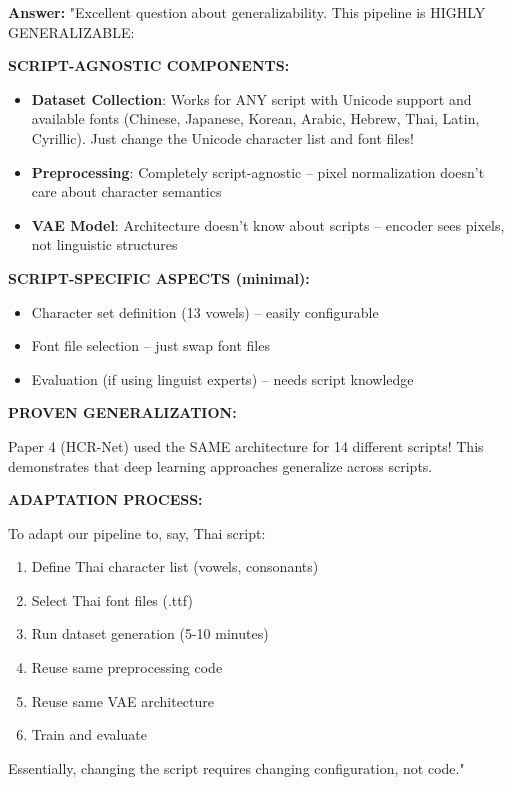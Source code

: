 \documentclass[11pt,a4paper]{article}
\begin{document}
\begin{answerbox}
\textbf{Answer:} "Excellent question about generalizability. This pipeline is HIGHLY GENERALIZABLE:

\textbf{SCRIPT-AGNOSTIC COMPONENTS:}
\begin{itemize}
\item \textbf{Dataset Collection}: Works for ANY script with Unicode support and available fonts (Chinese, Japanese, Korean, Arabic, Hebrew, Thai, Latin, Cyrillic). Just change the Unicode character list and font files!
\item \textbf{Preprocessing}: Completely script-agnostic -- pixel normalization doesn't care about character semantics
\item \textbf{VAE Model}: Architecture doesn't know about scripts -- encoder sees pixels, not linguistic structures
\end{itemize}

\textbf{SCRIPT-SPECIFIC ASPECTS (minimal):}
\begin{itemize}
\item Character set definition (13 vowels) -- easily configurable
\item Font file selection -- just swap font files
\item Evaluation (if using linguist experts) -- needs script knowledge
\end{itemize}

\textbf{PROVEN GENERALIZATION:}

Paper 4 (HCR-Net) used the SAME architecture for 14 different scripts! This demonstrates that deep learning approaches generalize across scripts.

\textbf{ADAPTATION PROCESS:}

To adapt our pipeline to, say, Thai script:
\begin{enumerate}
\item Define Thai character list (vowels, consonants)
\item Select Thai font files (.ttf)
\item Run dataset generation (5-10 minutes)
\item Reuse same preprocessing code
\item Reuse same VAE architecture
\item Train and evaluate
\end{enumerate}

Essentially, changing the script requires changing configuration, not code."
\end{answerbox}
\end{document}
